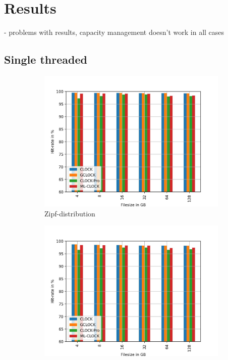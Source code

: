 \documentclass[
	12pt,
	a4paper,
	abstract,
	bibliography=totoc,
	chapterprefix,
	headings=openright,
	numbers=endperiod,
	parskip=half,
	twoside,
]{scrreprt}
\begin{document}
\section{Results}

- problems with results, capacity management doesn't work in all cases

\subsection{Single threaded}


\begin{figure}
	\centering
	\begin{subfigure}{0.4\textwidth}
		\includegraphics[width=\textwidth]{randread_zipf.jpg}		
		\caption{Zipf-distribution}
		\label{fig:randread zipf}
	\end{subfigure}
	\hfill
	\begin{subfigure}{0.4\textwidth}
		\includegraphics[width=\textwidth]{randread_normal.jpg}		

\end{subfigure}
\end{figure}
\end{document}

